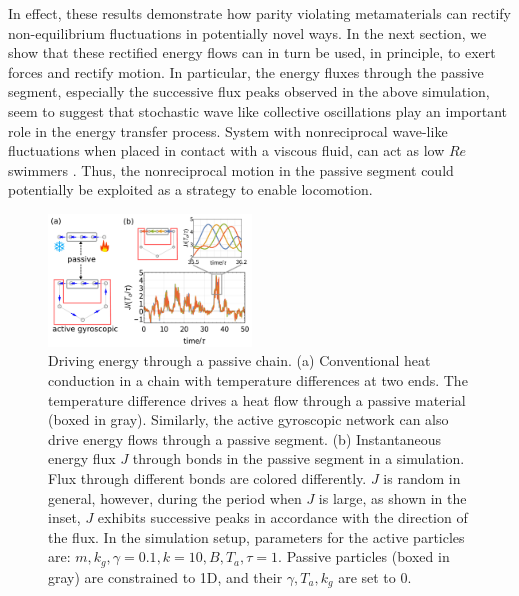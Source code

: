 \documentclass[
 preprint,
 preprintnumbers,
 amsmath,amssymb,
 aps,
 pre,
 longbibliography,
 superscriptaddress,
 10pt, twocolumn
]{revtex4-1}
\begin{document}
In effect, these results demonstrate how parity violating metamaterials can rectify non-equilibrium fluctuations in potentially novel ways. In the next section, we show that these rectified energy flows can in turn be used, in principle, to exert forces and rectify motion. In particular, the energy fluxes through the passive segment, especially the successive flux peaks observed in the above simulation, seem to suggest that stochastic wave like collective oscillations play an important role in the energy transfer process. System with nonreciprocal wave-like fluctuations when placed in contact with a viscous fluid, can act as low $Re$ swimmers \cite{Taylor1951AnalysisSwimming,Purcell1977LifeLow,Golestanian2008AnalyticResults}. Thus, the nonreciprocal motion in the passive segment could potentially be exploited as a strategy to enable locomotion. 



\begin{figure}[tbp]
	\centering
	\includegraphics[width=0.48\textwidth]{simulation_j.pdf}
    \caption{
    Driving energy through a passive chain.
    (a) Conventional heat conduction in a chain with temperature differences at two ends. The temperature difference drives a heat flow through a passive material (boxed in gray).
    Similarly, the active gyroscopic network can also drive energy flows through a passive segment.
    (b) Instantaneous energy flux $J$ through bonds in the passive segment in a simulation. Flux through different bonds are colored differently. $J$ is random in general, however, during the period when $J$ is large, as shown in the inset, $J$ exhibits successive peaks in accordance with the direction of the flux.
    In the simulation setup, parameters for the active particles are: $m,k_g,\gamma=0.1, k=10, B,T_a,\tau=1$. Passive particles (boxed in gray) are constrained to 1D, and their $\gamma,T_a,k_g$ are set to $0$.
    }
    \label{fig:simulation}
\end{figure}
\end{document}
